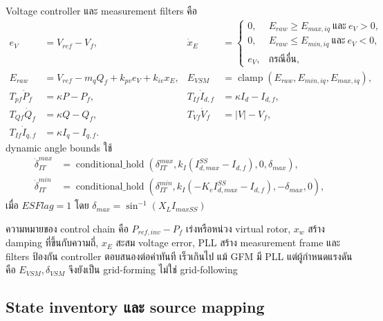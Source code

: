\documentclass[12pt,a4paper]{article}
\newcommand{\clamp}{\operatorname{clamp}}
\newcommand{\hold}{\operatorname{conditional\_hold}}
\begin{document}
Voltage controller และ measurement filters คือ
\begin{align}
e_V&=V_{ref}-V_f, &
\dot x_E&=\begin{cases}
0,&E_{raw}\ge E_{max,iq}\ \text{และ}\ e_V>0,\\
0,&E_{raw}\le E_{min,iq}\ \text{และ}\ e_V<0,\\
e_V,&\text{กรณีอื่น},
\end{cases}\\
E_{raw}&=V_{ref}-m_qQ_f+k_{pv}e_V+k_{iv}x_E,
&E_{VSM}&=\clamp(E_{raw},E_{min,iq},E_{max,iq}),\\
T_{pf}\dot P_f&=\kappa P-P_f,&T_{If}\dot I_{d,f}&=\kappa I_d-I_{d,f},\\
T_{Qf}\dot Q_f&=\kappa Q-Q_f,&T_{Vf}\dot V_f&=|V|-V_f,\\
T_{If}\dot I_{q,f}&=\kappa I_q-I_{q,f}.&&
\end{align}
dynamic angle bounds ใช้
\begin{align}
\dot\delta_{IT}^{max}&=\hold(\delta_{IT}^{max},
k_I(I_{d,max}^{SS}-I_{d,f}),0,\delta_{max}),\\
\dot\delta_{IT}^{min}&=\hold(\delta_{IT}^{min},
k_I(-K_eI_{d,max}^{SS}-I_{d,f}),-\delta_{max},0),
\end{align}
เมื่อ $ESFlag=1$ โดย $\delta_{max}=\sin^{-1}(X_LI_{maxSS})$

ความหมายของ control chain คือ $P_{ref,inv}-P_f$ เร่งหรือหน่วง virtual rotor,
$x_w$ สร้าง damping ที่ขึ้นกับความถี่, $x_E$ สะสม voltage error,
PLL สร้าง measurement frame และ filters ป้องกัน controller ตอบสนองต่อค่าทันที
เร็วเกินไป แม้ GFM มี PLL แต่ผู้กำหนดแรงดันคือ $E_{VSM},\delta_{VSM}$ จึงยังเป็น
grid-forming ไม่ใช่ grid-following

\subsection{State inventory และ source mapping}
\end{document}
